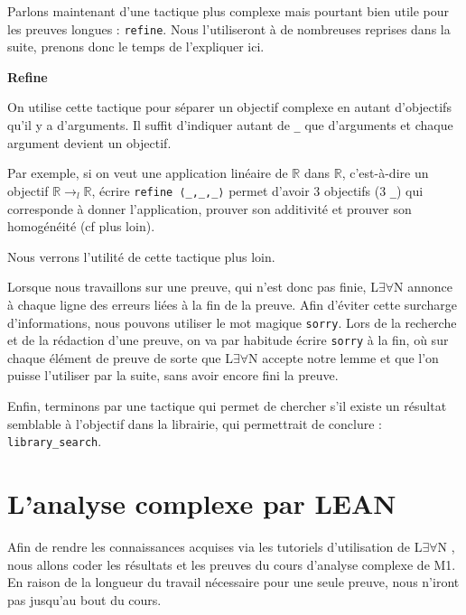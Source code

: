 \documentclass[a4paper, 11pt, twoside]{report}
\newcommand\R{\mathbb{R}}
\newcommand{\LEAN}{L$\exists\forall$N }
\begin{document}
Parlons maintenant d'une tactique plus complexe mais pourtant bien utile pour les preuves longues : \verb|refine|. Nous l'utiliseront à de nombreuses reprises dans la suite, prenons donc le temps de l'expliquer ici.

\begin{tactic}
	\centerline{\bfseries Refine}
	
	On utilise cette tactique pour séparer un objectif complexe en autant d'objectifs qu'il y a d'arguments. Il suffit d'indiquer autant de \verb|_| que d'arguments et chaque argument devient un objectif.
	
	\tcblower
	
	Par exemple, si on veut une application linéaire de $\R$ dans $\R$, c'est-à-dire un objectif $\R \to_l \R$, écrire \verb|refine ⟨_,_,_⟩| permet d'avoir 3 objectifs (3 \verb|_|) qui corresponde à donner l'application, prouver son additivité et prouver son homogénéité (cf plus loin).
\end{tactic}

Nous verrons l'utilité de cette tactique plus loin.

\medskip

Lorsque nous travaillons sur une preuve, qui n'est donc pas finie, \LEAN annonce à chaque ligne des erreurs liées à la fin de la preuve. Afin d'éviter cette surcharge d'informations, nous pouvons utiliser le mot magique \verb|sorry|. Lors de la recherche et de la rédaction d'une preuve, on va par habitude écrire \verb|sorry| à la fin, où sur chaque élément de preuve de sorte que \LEAN accepte notre lemme et que l'on puisse l'utiliser par la suite, sans avoir encore fini la preuve.

\medskip

Enfin, terminons par une tactique qui permet de chercher s'il existe un résultat semblable à l'objectif dans la librairie, qui permettrait de conclure : \verb|library_search|.








\section{L'analyse complexe par LEAN}

Afin de rendre les connaissances acquises via les tutoriels d'utilisation de \LEAN, nous allons coder les résultats et les preuves du cours d'analyse complexe de M1. En raison de la longueur du travail nécessaire pour une seule preuve, nous n'iront pas jusqu'au bout du cours.
\end{document}
